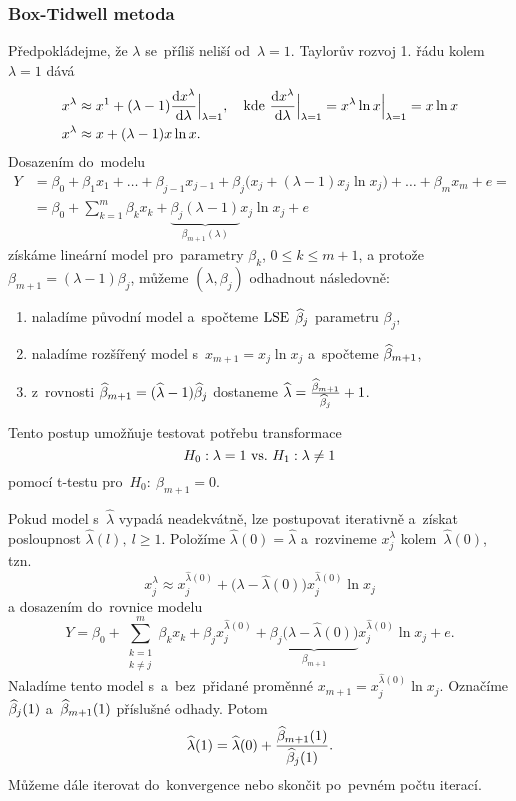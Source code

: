 \subsubsection{Box-Tidwell metoda}
Předpokládejme, že $\lambda$ se~příliš neliší od~$\lambda = 1$. Taylorův rozvoj 1. řádu kolem~$\lambda = 1$ dává
\begin{align*}
x^\lambda & \approx x^1+(\lambda-1)\frac{\mathrm{d} x^\lambda}{\mathrm{d} \lambda}\Big|_{\lambda = 1}, \quad \text{kde } \frac{\mathrm{d} x^\lambda}{\mathrm{d} \lambda}\Big|_{\lambda = 1} = x^\lambda \ln x \Big|_{\lambda = 1} = x\ln x \\
x^\lambda & \approx x+(\lambda-1)x\ln x.
\end{align*}
Dosazením do~modelu
\begin{align*}
	Y & = \beta_0+\beta_1 x_1+\dots+\beta_{j-1}x_{j-1}+\beta_j\big(x_j+(\lambda-1)x_j\ln x_j\big)+\dots+\beta_m x_m+e = \\
	& = \beta_0+\sum_{k = 1}^m \beta_k x_k+\underbrace{\beta_j(\lambda-1)}_{\beta_{m+1}(\lambda)}x_j\ln x_j+e
\end{align*}
získáme lineární model pro~parametry $\beta_k$, $0\leq k\leq m+1$, a protože $\beta_{m+1} = (\lambda-1)\beta_j$, můžeme $(\lambda,\beta_j)$ odhadnout následovně:
\begin{enumerate}[1)]
	\item naladíme původní model a~spočteme $\mathrm{LSE}$ $\widehat{\beta}_j$ parametru $\beta_j$,
	\item naladíme rozšířený model s~$x_{m+1} = x_j\ln x_j$ a~spočteme $\widehat{\beta}_{m+1}$,
	\item z~rovnosti $\widehat{\beta}_{m+1} = (\widehat{\lambda}-1)\widehat{\beta}_j$ dostaneme $\widehat{\lambda} = \frac{\widehat{\beta}_{m+1}}{\widehat{\beta}_j}+1$.
\end{enumerate}
Tento postup umožňuje testovat potřebu transformace
 $$ H_0: \lambda = 1 ~\text{vs.}~ H_1: \lambda\neq1 $$
pomocí t-testu pro~$H_0:~\beta_{m+1} = 0$.

\begin{remark}
Pokud model s~$\widehat{\lambda}$ vypadá neadekvátně, lze postupovat iterativně a~získat posloupnost $\widehat{\lambda}(l),~l\geq1$. Položíme $\widehat{\lambda}(0) = \widehat{\lambda}$ a~rozvineme $x_j^\lambda$ kolem~$\widehat{\lambda}(0)$, tzn. $$x_j^\lambda\approx x_j^{\widehat{\lambda}(0)}+\big(\lambda-\widehat{\lambda}(0)\big)x_j^{\widehat{\lambda}(0)}\ln x_j$$ a dosazením do~rovnice modelu
 $$
Y = \beta_0 + \sum_{\substack{k = 1 \\ k\neq j}}^m \beta_k x_k+\beta_j x_j^{\widehat{\lambda}(0)}+\underbrace{\beta_j\big(\lambda-\widehat{\lambda}(0)\big)}_{\beta_{m+1}}x_j^{\widehat{\lambda}(0)}\ln x_j+e.
 $$
Naladíme tento model s~a~bez~přidané proměnné $x_{m+1} = x_j^{\widehat{\lambda}(0)}\ln x_j$. Označíme $\widehat{\beta}_j(1)$ a~$\widehat{\beta}_{m+1}(1)$ příslušné odhady. Potom
 $$
\widehat{\lambda}(1) = \widehat{\lambda}(0)+\frac{\widehat{\beta}_{m+1}(1)}{\widehat{\beta}_j(1)}.
 $$
Můžeme dále iterovat do~konvergence nebo skončit po~pevném počtu iterací.
\end{remark}

